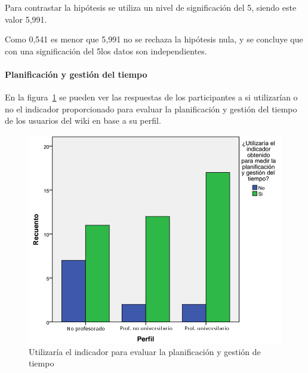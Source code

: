 \begin{center}
\end{center}

Para contrastar la hipótesis se utiliza un nivel de significación del 5\percentage, siendo este valor 5,991. 

\begin{center}
\end{center}

Como 0,541 es menor que 5,991 no se rechaza la hipótesis nula, y se concluye que con una significación del 5\percentage los datos son independientes.

\begin{center}
\end{center}
 
\paragraph*{Planificación y gestión del tiempo}
 
En la figura~\ref{fig:app:barras:perfil:planificacion} se pueden ver las respuestas de los participantes a si utilizarían o no el indicador proporcionado para evaluar la planificación y gestión del tiempo de los usuarios del wiki en base a su perfil.

\begin{figure}
  \begin{center}
    \includegraphics[scale=0.3]{barras_perfil_planificacion.png}
  \end{center}
  \caption{Utilizaría el indicador para evaluar la planificación y gestión de tiempo}
  \label{fig:app:barras:perfil:planificacion}
\end{figure}

